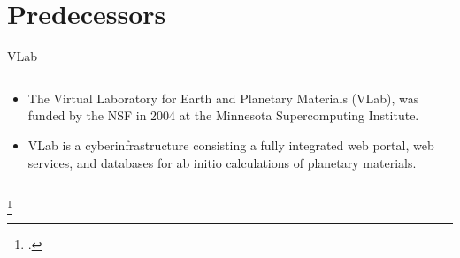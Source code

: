 \section{Predecessors}

\begin{frame}{VLab}
    \begin{columns}[t]
        \begin{column}{0.4\textwidth}
            \begin{itemize}
                \item The Virtual Laboratory for Earth and Planetary Materials (VLab), was
                      funded by the NSF in 2004 at the Minnesota Supercomputing Institute.
                \item VLab is a cyberinfrastructure consisting a fully integrated web
                      portal, web services, and databases for ab initio calculations of
                      planetary materials.
            \end{itemize}
        \end{column}

        \begin{column}{0.6\textwidth}
        \end{column}
    \end{columns}
    \footcitetext{DASILVA2007321}

\end{frame}

